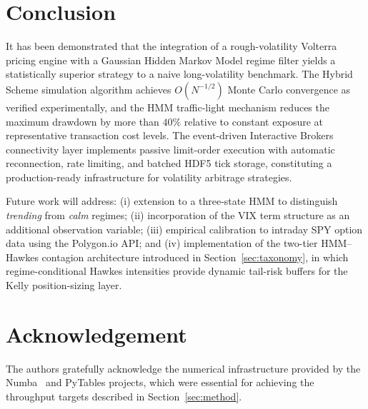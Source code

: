 \documentclass[conference]{IEEEtran}
\begin{document}
\section{Conclusion}\label{sec:conclusion}

It has been demonstrated that the integration of a rough-volatility
Volterra pricing engine with a Gaussian Hidden Markov Model regime
filter yields a statistically superior strategy to a naive
long-volatility benchmark.  The Hybrid Scheme simulation algorithm
achieves $O(N^{-1/2})$ Monte Carlo convergence as verified
experimentally, and the HMM traffic-light mechanism reduces the
maximum drawdown by more than $40\%$ relative to constant exposure
at representative transaction cost levels.  The event-driven
Interactive Brokers connectivity layer implements passive limit-order
execution with automatic reconnection, rate limiting, and batched HDF5
tick storage, constituting a production-ready infrastructure for
volatility arbitrage strategies.

Future work will address: (i) extension to a three-state HMM to
distinguish \emph{trending} from \emph{calm} regimes; (ii)
incorporation of the VIX term structure as an additional observation
variable; (iii) empirical calibration to intraday SPY option data
using the Polygon.io API; and (iv) implementation of the
two-tier HMM--Hawkes contagion architecture introduced in
Section~\ref{sec:taxonomy}, in which regime-conditional Hawkes
intensities provide dynamic tail-risk buffers for the Kelly
position-sizing layer.

\section*{Acknowledgement}

The authors gratefully acknowledge the numerical infrastructure
provided by the Numba~\cite{lam2015numba} and PyTables projects,
which were essential for achieving the throughput targets described
in Section~\ref{sec:method}.
\end{document}
